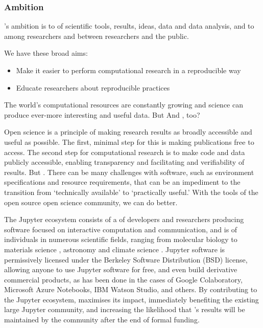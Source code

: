 
\subsubsection{Ambition}

\TheProject's ambition is to  of scientific
tools, results, ideas, data and data analysis, and to 
 among researchers and between researchers and the public.

We have these broad aims:
\begin{itemize}
\item Make it easier to perform computational research in a reproducible way
\item Educate researchers about reproducible practices
\end{itemize}

The world's computational resources are
constantly growing and science can produce ever-more interesting and useful 
data.  But   And , too?

Open science is a principle of making research
results as broadly accessible and useful as possible.  The first,
minimal step for this is making publications free to access.  The
second step for computational research is to make code and data
publicly accessible, enabling transparency and facilitating
 and verifiability of results.  But .  There can
be many challenges with software, such as environment specifications
and resource requirements, that can be an impediment to the transition
from `technically available' to `practically useful.'  With the tools
of the open source open science community, we can do better.


The Jupyter ecosystem consists of a  of
developers and researchers producing software focused on interactive
computation and communication, and is  of
individuals in numerous scientific fields, ranging from molecular
biology \cite{Wang2016} to materials science \cite{Hughes2014},
astronomy \cite{Baron2017} and climate science
\cite{Laken2015,Laken2015b}.  Jupyter software is permissively
licensed under the Berkeley Software Distribution (BSD) license,
allowing anyone to use Jupyter software for free, and even build
derivative commercial products, as has been done in the cases of
Google Colaboratory, Microsoft Azure Notebooks, IBM Watson Studio, and
others.  By contributing to the Jupyter ecosystem,
\TheProject maximises its impact, immediately benefiting the existing
large Jupyter community, and increasing the likelihood that
\TheProject's results will be maintained by the community after the
end of formal funding.

